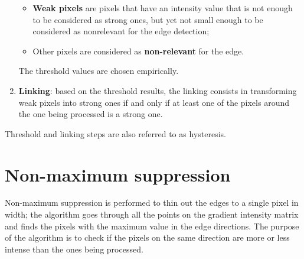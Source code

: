 \documentclass{article}
\def\pixelmap{{%
{2,2,2,1,0,0,0,0,0},
{1,2,2,1,0,0,1,0,0},
{1,1,2,2,2,1,0,0,0},
{0,1,1,2,2,1,1,0,0},
{0,1,1,1,2,2,1,1,0},
{0,0,0,1,2,2,2,1,0},
{0,0,0,0,1,2,2,2,1},
{0,0,0,0,1,1,2,2,1},
{0,0,0,1,0,1,2,2,2},
}}
\begin{document}
\begin{enumerate}[start=0]
\begin{itemize}
        \item \textbf{Weak pixels} are pixels that have an intensity value that is not enough to be considered as strong ones, but yet not small enough to be considered as nonrelevant for the edge detection;
        \item Other pixels are considered as \textbf{non-relevant} for the edge.
    \end{itemize}
    The threshold values are chosen empirically.
    \item \textbf{Linking}: based on the threshold results, the linking consists in transforming weak pixels into strong ones if and only if at least one of the pixels around the one being processed is a strong one.
\end{enumerate}

Threshold and linking steps are also referred to as hysteresis.

\newpage

\section*{Non-maximum suppression}

Non-maximum suppression is performed to thin out the edges to a single pixel in width; the algorithm goes through all the points on the gradient intensity matrix and finds the pixels with the maximum value in the edge directions. The purpose of the algorithm is to check if the pixels on the same direction are more or less intense than the ones being processed.

\vspace{2cm}

\begin{center}
\end{center}
\end{document}
